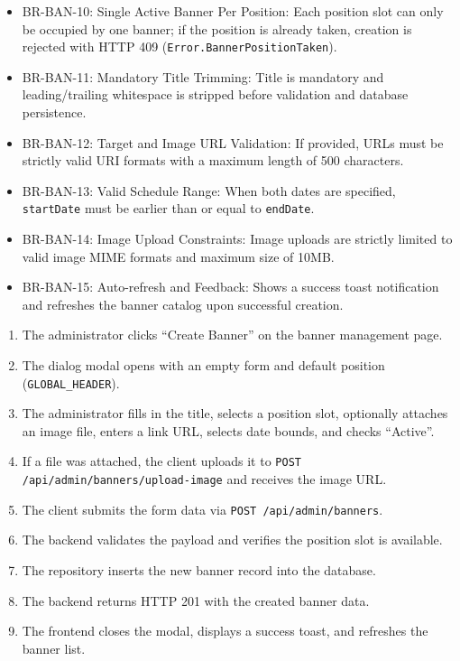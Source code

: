 \begin{itemize}[leftmargin=1.6em,topsep=3pt,itemsep=2pt,parsep=0pt,label=$\bullet$]\brrulelist
    \item BR-BAN-10: Single Active Banner Per Position: Each position slot can only be occupied by one banner; if the position is already taken, creation is rejected with HTTP 409 (\texttt{Error.BannerPositionTaken}).
    \item BR-BAN-11: Mandatory Title Trimming: Title is mandatory and leading/trailing whitespace is stripped before validation and database persistence.
    \item BR-BAN-12: Target and Image URL Validation: If provided, URLs must be strictly valid URI formats with a maximum length of 500 characters.
    \item BR-BAN-13: Valid Schedule Range: When both dates are specified, \texttt{startDate} must be earlier than or equal to \texttt{endDate}.
    \item BR-BAN-14: Image Upload Constraints: Image uploads are strictly limited to valid image MIME formats and maximum size of 10MB.
    \item BR-BAN-15: Auto-refresh and Feedback: Shows a success toast notification and refreshes the banner catalog upon successful creation.
\end{itemize}

\begin{enumerate}[leftmargin=1.6em,topsep=3pt,itemsep=2pt,parsep=0pt]
    \item The administrator clicks ``Create Banner'' on the banner management page.
    \item The dialog modal opens with an empty form and default position (\texttt{GLOBAL\_HEADER}).
    \item The administrator fills in the title, selects a position slot, optionally attaches an image file, enters a link URL, selects date bounds, and checks ``Active''.
    \item If a file was attached, the client uploads it to \texttt{POST /api/admin/banners/upload-image} and receives the image URL.
    \item The client submits the form data via \texttt{POST /api/admin/banners}.
    \item The backend validates the payload and verifies the position slot is available.
    \item The repository inserts the new banner record into the database.
    \item The backend returns HTTP 201 with the created banner data.
    \item The frontend closes the modal, displays a success toast, and refreshes the banner list.
\end{enumerate}

